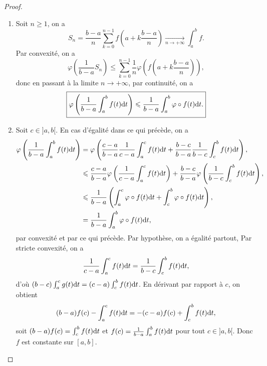 \documentclass[12pt]{article}
\begin{document}
\begin{proof}
    \phantom{}
    \begin{enumerate}
        \item Soit $n\geqslant1$, on a 
        \begin{equation*}
            S_n=\frac{b-a}{n}\sum_{k=0}^{n-1}f\left(a+k\frac{b-a}{n}\right)\xrightarrow[n\to+\infty]{}\int_{a}^{b}f.
        \end{equation*}
        Par convexité, on a 
        \begin{equation*}
            \varphi\left(\frac{1}{b-a}S_n\right)\leqslant\sum_{k=0}^{n-1}\frac{1}{n}\varphi\left(f\left(a+k\frac{b-a}{n}\right)\right),
        \end{equation*}
        donc en passant à la limite $n\to+\infty$, par continuité, on a 
        \begin{equation*}
            \boxed{
            \varphi\left(\frac{1}{b-a}\int_{a}^{b}f(t)\mathrm{d} t\right)\leqslant\frac{1}{b-a}\int_{a}^{b}\varphi\circ f(t)\mathrm{d} t.}
        \end{equation*}

        \item Soit $c\in]a,b[$. En cas d'égalité dans ce qui précède, on a 
        \begin{align*}
            \varphi\left(\frac{1}{b-a}\int_{a}^{b}f(t)\mathrm{d} t\right)
            &=\varphi\left(\frac{c-a}{b-a}\frac{1}{c-a}\int_{a}^{c}f(t)\mathrm{d} t+\frac{b-c}{b-a}\frac{1}{b-c}\int_{c}^{b}f(t)\mathrm{d} t\right),\\
            &\leqslant\frac{c-a}{b-a}\varphi\left(\frac{1}{c-a}\int_{a}^{c}f(t)\mathrm{d} t\right)+\frac{b-c}{b-a}\varphi\left(\frac{1}{b-c}\int_{c}^{b}f(t)\mathrm{d} t\right),\\
            &\leqslant\frac{1}{b-a}\left(\int_{a}^{c}\varphi\circ f(t)\mathrm{d} t+\int_{c}^{b}\varphi\circ f(t)\mathrm{d} t\right),\\
            &=\frac{1}{b-a}\int_{a}^{b}\varphi\circ f(t)\mathrm{d} t,
        \end{align*}
        par convexité et par ce qui précède. Par hypothèse, on a égalité partout, Par stricte convexité, on a 
        \begin{equation*}
            \frac{1}{c-a}\int_{a}^{c}f(t)\mathrm{d} t=\frac{1}{b-c}\int_{c}^{b}f(t)\mathrm{d} t,
        \end{equation*}
        d'où $(b-c)\int_{a}^{c}g(t)\mathrm{d} t=(c-a)\int_{c}^{b}f(t)\mathrm{d} t$. En dérivant par rapport à $c$, on obtient
        \begin{equation*}
            (b-a)f(c)-\int_{a}^{c}f(t)\mathrm{d} t=-(c-a)f(c)+\int_{c}^{b}f(t)\mathrm{d} t,
        \end{equation*}
        soit $(b-a)f(c)=\int_{c}^{b}f(t)\mathrm{d} t$ et $f(c)=\frac{1}{b-a}\int_{a}^{b}f(t)\mathrm{d} t$ pour tout $c\in]a,b[$. Donc $f$ est constante sur $[a,b]$.
    \end{enumerate}
\end{proof}
\end{document}
